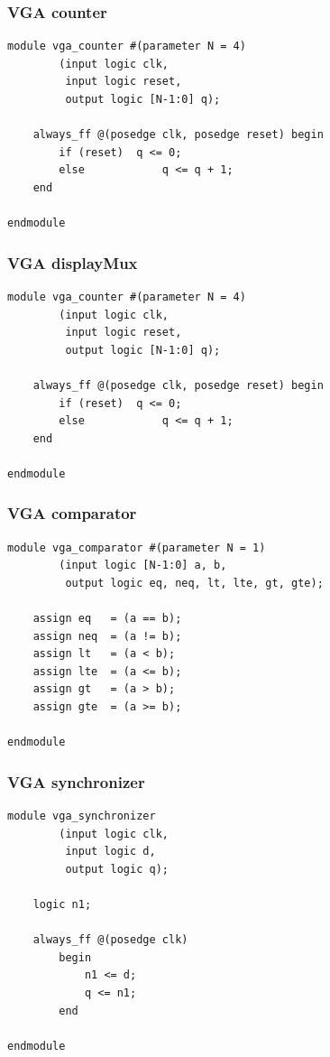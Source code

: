 \documentclass[a4paper]{article}
\begin{document}
\subsubsection{VGA counter}

\begin{Verbatim}
module vga_counter #(parameter N = 4)
		(input logic clk,
		 input logic reset,
		 output logic [N-1:0] q);

	always_ff @(posedge clk, posedge reset) begin
		if (reset)	q <= 0;
		else			q <= q + 1;
	end

endmodule
\end{Verbatim}

\subsubsection{VGA displayMux}

\begin{Verbatim}
module vga_counter #(parameter N = 4)
		(input logic clk,
		 input logic reset,
		 output logic [N-1:0] q);

	always_ff @(posedge clk, posedge reset) begin
		if (reset)	q <= 0;
		else			q <= q + 1;
	end

endmodule
\end{Verbatim}

\subsubsection{VGA comparator}

\begin{Verbatim}
module vga_comparator #(parameter N = 1)
		(input logic [N-1:0] a, b,
		 output logic eq, neq, lt, lte, gt, gte);

	assign eq	= (a == b);
	assign neq	= (a != b);
	assign lt	= (a < b);
	assign lte	= (a <= b);
	assign gt	= (a > b);
	assign gte	= (a >= b);

endmodule
\end{Verbatim}

\subsubsection{VGA synchronizer}

\begin{Verbatim}
module vga_synchronizer
		(input logic clk,
		 input logic d,
		 output logic q);

	logic n1;
	
	always_ff @(posedge clk)
		begin
			n1 <= d;
			q <= n1;
		end

endmodule
\end{Verbatim}
\end{document}
